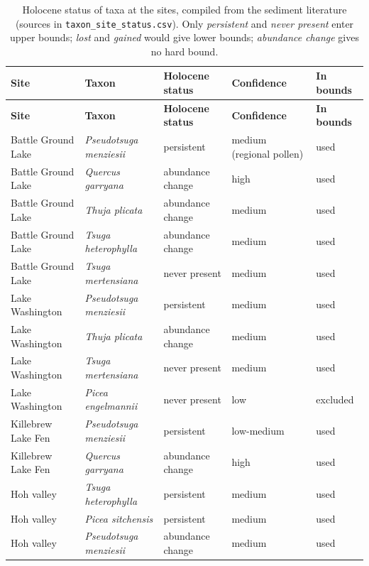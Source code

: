 {\small
\begin{longtable}{>{\raggedright\arraybackslash}p{}>{\raggedright\arraybackslash}p{}>{\raggedright\arraybackslash}p{}>{\raggedright\arraybackslash}p{}l}
\caption{Holocene status of taxa at the sites, compiled from the sediment literature (sources in \texttt{taxon\_site\_status.csv}). Only \emph{persistent} and \emph{never present} enter upper bounds; \emph{lost} and \emph{gained} would give lower bounds; \emph{abundance change} gives no hard bound.}\label{tab:status}\\
\toprule
\textbf{Site} & \textbf{Taxon} & \textbf{Holocene status} & \textbf{Confidence} & \textbf{In bounds} \\
\midrule
\endfirsthead
\toprule
\textbf{Site} & \textbf{Taxon} & \textbf{Holocene status} & \textbf{Confidence} & \textbf{In bounds} \\
\midrule
\endhead
\bottomrule
\endfoot
Battle Ground Lake & \emph{Pseudotsuga menziesii} & persistent & medium (regional pollen) & used \\
Battle Ground Lake & \emph{Quercus garryana} & abundance change & high & used \\
Battle Ground Lake & \emph{Thuja plicata} & abundance change & medium & used \\
Battle Ground Lake & \emph{Tsuga heterophylla} & abundance change & medium & used \\
Battle Ground Lake & \emph{Tsuga mertensiana} & never present & medium & used \\
Lake Washington & \emph{Pseudotsuga menziesii} & persistent & medium & used \\
Lake Washington & \emph{Thuja plicata} & abundance change & medium & used \\
Lake Washington & \emph{Tsuga mertensiana} & never present & medium & used \\
Lake Washington & \emph{Picea engelmannii} & never present & low & excluded \\
Killebrew Lake Fen & \emph{Pseudotsuga menziesii} & persistent & low-medium & used \\
Killebrew Lake Fen & \emph{Quercus garryana} & abundance change & high & used \\
Hoh valley & \emph{Tsuga heterophylla} & persistent & medium & used \\
Hoh valley & \emph{Picea sitchensis} & persistent & medium & used \\
Hoh valley & \emph{Pseudotsuga menziesii} & abundance change & medium & used \\

\end{longtable}}
